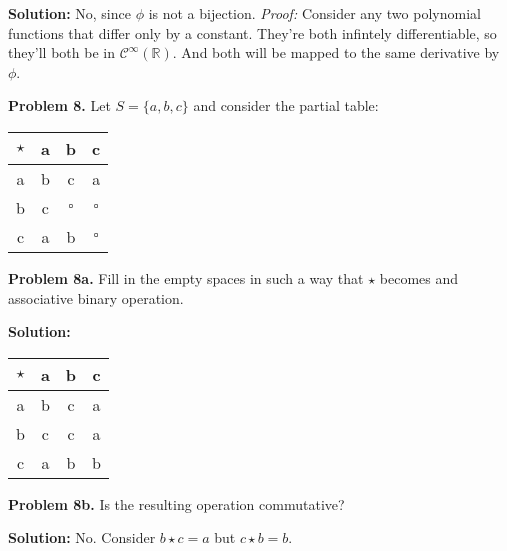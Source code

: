 \documentclass[12pt, letterpaper]{article}
\newenvironment{problem}
    [1]
    {\noindent \textbf{Problem #1.}}
    {\vspace{3mm}}
\newenvironment{solution}
    [0]
    {\noindent \textbf{Solution:}} 
    {\vspace{3mm}}
\begin{document}
    \begin{solution}
        No, since $\phi$ is not a bijection. \emph{Proof:} Consider any two 
        polynomial functions that differ only by a constant. They're both
        infintely differentiable, so they'll both be in $\mathcal{C}^\infty(\mathbb{R})$. 
        And both will be mapped to the same derivative by $\phi$.
    \end{solution}

    \begin{problem}{8}
        Let $S = \{a, b, c\}$ and consider the partial table:
        \begin{center}
        \begin{tabular}{ c | c c c } 
            $\star$ & a & b & c \\ 
            \hline
            a & b & c & a \\ 
            b & c & $\square$ & $\square$ \\ 
            c & a & b & $\square$ \\ 
        \end{tabular}
        \end{center}
    \end{problem}

    \begin{problem}{8a}
        Fill in the empty spaces in such a way that $\star$ becomes and associative binary 
        operation.
    \end{problem}

    \begin{solution}
        \begin{center}
            \begin{tabular}{ c | c c c } 
                $\star$ & a & b & c \\ 
                \hline
                a & b & c & a \\ 
                b & c & c & a \\ 
                c & a & b & b\\ 
            \end{tabular}
            \end{center}
    \end{solution}

    \begin{problem}{8b}
        Is the resulting operation commutative?
    \end{problem}

    \begin{solution}
        No. Consider $b \star c = a$ but $c \star b = b$.
    \end{solution}
\end{document}
